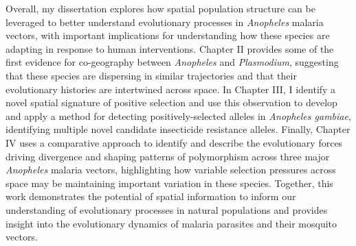 Overall, my dissertation explores how spatial population structure can be leveraged to better understand evolutionary processes
in \textit{Anopheles} malaria vectors, 
with important implications for understanding how these species are adapting in response to human interventions.
Chapter II provides some of the first evidence for co-geography between \textit{Anopheles} and \textit{Plasmodium},
suggesting that these species are dispersing in similar trajectories and that their evolutionary histories are intertwined across space.
In Chapter III, I identify a novel spatial signature of positive selection and use this observation to develop and apply a method
for detecting positively-selected alleles in \textit{Anopheles gambiae}, identifying multiple novel candidate insecticide resistance alleles.
Finally, Chapter IV uses a comparative approach to identify and describe the evolutionary forces driving divergence and shaping
patterns of polymorphism across three major \textit{Anopheles} malaria vectors, highlighting how variable selection pressures
across space may be maintaining important variation in these species.
Together, this work demonstrates the potential of spatial information to inform our understanding of evolutionary processes
in natural populations and provides insight into the evolutionary dynamics of malaria parasites and their mosquito vectors.